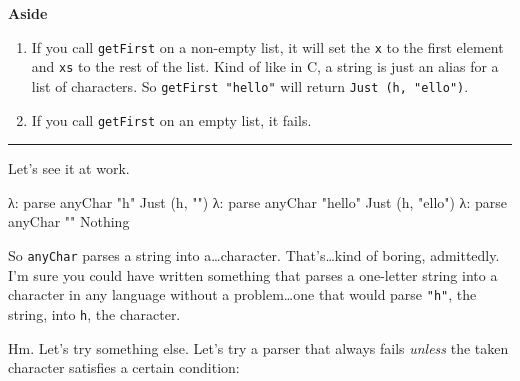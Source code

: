 \documentclass[]{article}
\newenvironment{Shaded}{}{}
\newcommand{\CharTok}[1]{\textcolor[rgb]{0.25,0.44,0.63}{#1}}
\newcommand{\DataTypeTok}[1]{\textcolor[rgb]{0.56,0.13,0.00}{#1}}
\newcommand{\NormalTok}[1]{#1}
\newcommand{\OperatorTok}[1]{\textcolor[rgb]{0.40,0.40,0.40}{#1}}
\newcommand{\StringTok}[1]{\textcolor[rgb]{0.25,0.44,0.63}{#1}}
\begin{document}
\textbf{Aside}

\begin{enumerate}
\def\labelenumi{\arabic{enumi}.}
\tightlist
\item
  If you call \texttt{getFirst} on a non-empty list, it will set the \texttt{x}
  to the first element and \texttt{xs} to the rest of the list. Kind of like in
  C, a string is just an alias for a list of characters. So
  \texttt{getFirst\ "hello"} will return
  \texttt{Just\ (\textquotesingle{}h\textquotesingle{},\ "ello")}.
\item
  If you call \texttt{getFirst} on an empty list, it fails.
\end{enumerate}

\begin{center}\rule{0.5\linewidth}{0.5pt}\end{center}

Let's see it at work.

\begin{Shaded}
\begin{Highlighting}[]
\NormalTok{λ}\OperatorTok{:}\NormalTok{ parse anyChar }\StringTok{"h"}
\DataTypeTok{Just}\NormalTok{ (}\CharTok{\textquotesingle{}h\textquotesingle{}}\NormalTok{, }\StringTok{""}\NormalTok{)}
\NormalTok{λ}\OperatorTok{:}\NormalTok{ parse anyChar }\StringTok{"hello"}
\DataTypeTok{Just}\NormalTok{ (}\CharTok{\textquotesingle{}h\textquotesingle{}}\NormalTok{, }\StringTok{"ello"}\NormalTok{)}
\NormalTok{λ}\OperatorTok{:}\NormalTok{ parse anyChar }\StringTok{""}
\DataTypeTok{Nothing}
\end{Highlighting}
\end{Shaded}

So \texttt{anyChar} parses a string into a\ldots character. That's\ldots kind of
boring, admittedly. I'm sure you could have written something that parses a
one-letter string into a character in any language without a problem\ldots one
that would parse \texttt{"h"}, the string, into
\texttt{\textquotesingle{}h\textquotesingle{}}, the character.

Hm. Let's try something else. Let's try a parser that always fails \emph{unless}
the taken character satisfies a certain condition:
\end{document}
